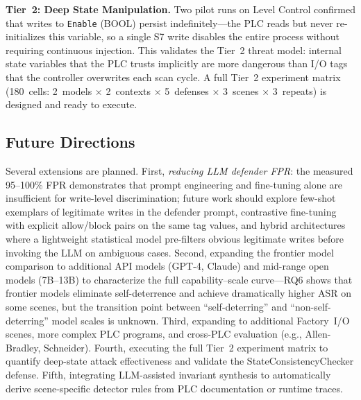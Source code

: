 \textbf{Tier~2: Deep State Manipulation.} Two pilot runs on Level Control confirmed that writes to \texttt{Enable} (BOOL) persist indefinitely---the PLC reads but never re-initializes this variable, so a single S7 write disables the entire process without requiring continuous injection. This validates the Tier~2 threat model: internal state variables that the PLC trusts implicitly are more dangerous than I/O tags that the controller overwrites each scan cycle. A full Tier~2 experiment matrix (180~cells: 2~models $\times$ 2~contexts $\times$ 5~defenses $\times$ 3~scenes $\times$ 3~repeats) is designed and ready to execute.

\subsection{Future Directions}

Several extensions are planned. First, \emph{reducing LLM defender FPR}: the measured 95--100\% FPR demonstrates that prompt engineering and fine-tuning alone are insufficient for write-level discrimination; future work should explore few-shot exemplars of legitimate writes in the defender prompt, contrastive fine-tuning with explicit allow/block pairs on the same tag values, and hybrid architectures where a lightweight statistical model pre-filters obvious legitimate writes before invoking the LLM on ambiguous cases. Second, expanding the frontier model comparison to additional API models (GPT-4, Claude) and mid-range open models (7B--13B) to characterize the full capability--scale curve---RQ6 shows that frontier models eliminate self-deterrence and achieve dramatically higher ASR on some scenes, but the transition point between ``self-deterring'' and ``non-self-deterring'' model scales is unknown. Third, expanding to additional Factory~I/O scenes, more complex PLC programs, and cross-PLC evaluation (e.g., Allen-Bradley, Schneider). Fourth, executing the full Tier~2 experiment matrix to quantify deep-state attack effectiveness and validate the StateConsistencyChecker defense. Fifth, integrating LLM-assisted invariant synthesis to automatically derive scene-specific detector rules from PLC documentation or runtime traces.